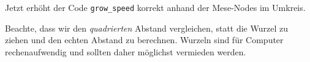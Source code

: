 \begin{Shaded}
\begin{Highlighting}[]
  \OperatorTok{=} \OperatorTok{(}\OperatorTok{,} \OperatorTok{\{}  \OperatorTok{=} \OperatorTok{,}  \OperatorTok{=} \OperatorTok{,}  \OperatorTok{=}  \OperatorTok{\})}
  \OperatorTok{=} \OperatorTok{(}\OperatorTok{,} \OperatorTok{\{}  \OperatorTok{=} \OperatorTok{,}  \OperatorTok{=} \OperatorTok{,}  \OperatorTok{=}  \OperatorTok{\})}
  \OperatorTok{=}
    \OperatorTok{(}\OperatorTok{,} \OperatorTok{,} \OperatorTok{\{}  \OperatorTok{\})}
  \OperatorTok{=} 
  \OperatorTok{=} \OperatorTok{,} \OperatorTok{\#} 
      \OperatorTok{=} \OperatorTok{(}\OperatorTok{[}\OperatorTok{],} \OperatorTok{)}
         \OperatorTok{*} 
            \OperatorTok{+}  \OperatorTok{*} 
            \OperatorTok{+}  \OperatorTok{*} 
        \OperatorTok{\textless{}=}  \OperatorTok{*} 
         \OperatorTok{=}  \OperatorTok{+} 
\end{Highlighting}
\end{Shaded}

Jetzt erhöht der Code \texttt{grow\_\allowbreak{}speed} korrekt anhand
der Mese-Nodes im Umkreis.

Beachte, dass wir den \emph{quadrierten} Abstand vergleichen, statt die
Wurzel zu ziehen und den echten Abstand zu berechnen. Wurzeln sind für
Computer rechenaufwendig und sollten daher möglichst vermieden werden.

